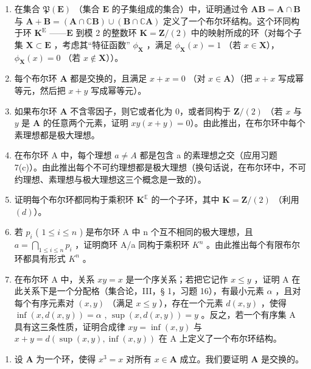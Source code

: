 \begin{enumerate}
\def\labelenumi{(\alph{enumi})}
\item
  在集合 \(\mathfrak{P}(\mathbf{E})\) （集合 \(\mathbf{E}\) 的子集组成的集合）中，证明通过令 \(\mathbf{AB} = \mathbf{A} \cap \mathbf{B}\) 与 \(\mathbf{A} + \mathbf{B} = (\mathbf{A} \cap \mathbb{C}\mathbf{B}) \cup (\mathbf{B} \cap \mathbb{C}\mathbf{A})\) 定义了一个布尔环结构。这个环同构于环 \(\mathbf{K}^{\mathrm{E}}\) ——\(\mathbf{E}\) 到模 2 的整数环 \(\mathbf{K} = \mathbf{Z}/(2)\) 中的映射所成的环（对每个子集 \(\mathbf{X} \subset \mathbf{E}\) ，考虑其“特征函数” \(\phi_{\mathbf{X}}\) ，满足 \(\phi_{\mathbf{X}}(x) = 1\) （若 \(x \in \mathbf{X}\)），\(\phi_{\mathbf{X}}(x) = 0\) （若 \(x \notin \mathbf{X}\)））。
\item
  每个布尔环 \(\mathbf{A}\) 都是交换的，且满足 \(x + x = 0\) （对 \(x \in \mathbf{A}\)）（把 \(x + x\) 写成幂等元，然后把 \(x + y\) 写成幂等元）。
\item
  如果布尔环 \(\mathbf{A}\) 不含零因子，则它或者化为 0，或者同构于 \(\mathbf{Z} / (2)\) （若 \(x\) 与 \(y\) 是 \(\mathbf{A}\) 的任意两个元素，证明 \(xy(x + y) = 0\)）。由此推出，在布尔环中每个素理想都是极大理想。
\item
  在布尔环 A 中，每个理想 \(a \neq A\) 都是包含 a 的素理想之交（应用习题 7(c)）。由此推出每个不可约理想都是极大理想（换句话说，在布尔环中，不可约理想、素理想与极大理想这三个概念是一致的）。
\item
  证明每个布尔环都同构于乘积环 \(\mathbf{K}^{\mathbb{E}}\) 的一个子环，其中 \(\mathbf{K} = \mathbf{Z}/(2)\) （利用 \((d)\)）。
\item
  若 \(p_{i}\) ( \(1 \leqslant i \leqslant n\) ) 是布尔环 A 中 n 个互不相同的极大理想，且 \(a = \bigcap_{1 \leqslant i \leqslant n} p_{i}\) ，证明商环 A/a 同构于乘积环 \(K^{n}\) 。由此推出每个有限布尔环都具有形式 \(K^{n}\) 。
\item
  在布尔环 A 中，关系 \(xy = x\) 是一个序关系；若把它记作 \(x \leqslant y\) ，证明 A 在此关系下是一个分配格（集合论，III，§ 1，习题 16），有最小元素 \(\alpha\) ，且对每个有序元素对 \((x, y)\) （满足 \(x \leqslant y\) ），存在一个元素 \(d(x, y)\) ，使得 \(\inf(x, d(x, y)) = \alpha\) , \(\sup(x, d(x, y)) = y\) 。反之，若一个有序集 A 具有这三条性质，证明合成律 \(xy = \inf(x, y)\) 与 \(x + y = d(\sup(x, y), \inf(x, y))\) 在 A 上定义了一个布尔环结构。
\end{enumerate}

\begin{enumerate}
\def\labelenumi{\arabic{enumi}.}
\setcounter{enumi}{8}
\tightlist
\item
  设 \(\mathbf{A}\) 为一个环，使得 \(x^3 = x\) 对所有 \(x \in \mathbf{A}\) 成立。我们要证明 \(\mathbf{A}\) 是交换的。
\end{enumerate}

